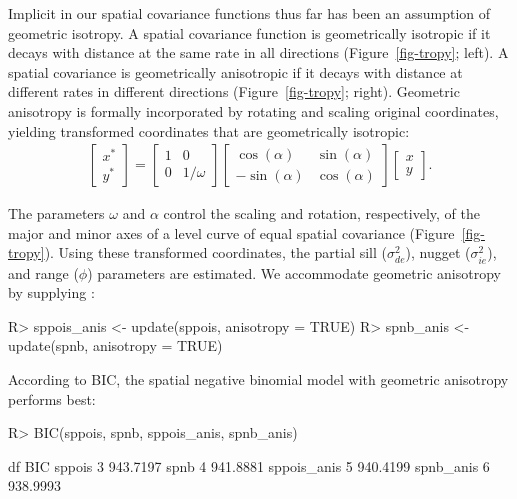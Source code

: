 \documentclass[
]{jss}
\begin{document}
Implicit in our spatial covariance functions thus far has been an
assumption of geometric isotropy. A spatial covariance function is
geometrically isotropic if it decays with distance at the same rate in
all directions (Figure~\ref{fig-tropy}; left). A spatial covariance is
geometrically anisotropic if it decays with distance at different rates
in different directions (Figure~\ref{fig-tropy}; right). Geometric
anisotropy is formally incorporated by rotating and scaling original
coordinates, yielding transformed coordinates that are geometrically
isotropic: \begin{align}
  \begin{bmatrix}
    x^* \\
    y^*
  \end{bmatrix} = 
  \begin{bmatrix}
    1 & 0 \\
    0 & 1 / \omega
  \end{bmatrix}
  \begin{bmatrix}
    \cos(\alpha) & \sin(\alpha) \\
    -\sin(\alpha) & \cos(\alpha)
  \end{bmatrix}  
  \begin{bmatrix}
    x \\
    y
  \end{bmatrix}.
\end{align}

The parameters \(\omega\) and \(\alpha\) control the scaling and
rotation, respectively, of the major and minor axes of a level curve of
equal spatial covariance (Figure~\ref{fig-tropy}). Using these
transformed coordinates, the partial sill (\(\sigma^2_{de}\)), nugget
(\(\sigma^2_{ie}\)), and range (\(\phi\)) parameters are estimated. We
accommodate geometric anisotropy by supplying :

\begin{CodeChunk}
\begin{CodeInput}
R> sppois_anis <- update(sppois, anisotropy = TRUE)
R> spnb_anis <- update(spnb, anisotropy = TRUE)
\end{CodeInput}
\end{CodeChunk}

According to BIC, the spatial negative binomial model with geometric
anisotropy performs best:

\begin{CodeChunk}
\begin{CodeInput}
R> BIC(sppois, spnb, sppois_anis, spnb_anis)
\end{CodeInput}
\begin{CodeOutput}
            df      BIC
sppois       3 943.7197
spnb         4 941.8881
sppois_anis  5 940.4199
spnb_anis    6 938.9993
\end{CodeOutput}
\end{CodeChunk}
\end{document}
